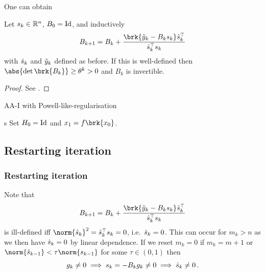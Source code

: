 \begin{frame}
	One can obtain
	\begin{lemma}
		Let $s_k\in\mathbb{R}^n$, $B_0=\operatorname{Id}$, and inductively
		\begin{align*}
			B_{k+1} = B_k+\frac{\brk{\tiy_k-B_ks_k}\hs_k^\top}{\hs_k^\top s_k}
		\end{align*}
		with $\hat{s}_k$ and $\tilde{y}_k$ defined as before. If this is well-defined then $\abs{\det\brk{B_k}}\geq \theta^k>0$ and $B_k$ is invertible.
	\end{lemma}
	\begin{proof}
		See \cite[Lemma 2]{ZhaAA}.
	\end{proof}
\end{frame}

\begin{frame}
	\begin{algorithm}[H]
	\caption{AA-I with Powell-like-regularisation}
	\color{gray}
s	
	\BlankLine
	Set $H_0=\operatorname{Id}$ and $x_1=f\brk{x_0}$.
	
	\end{algorithm}
\end{frame}

\subsection{Restarting iteration}
\begin{frame}
	\frametitle{Restarting iteration}
	Note that
	\begin{align*}
		B_{k+1} = B_k+\frac{\brk{\tiy_k-B_ks_k}\hs_k^\top}{\hs_k^\top s_k}
	\end{align*}
	is ill-defined iff $\norm{\hs_k}^2=\hs_k^\top s_k=0$, i.e.\ $\hat{s}_k=0$. This can occur for $m_k>n$ as we then have $\hat{s}_k=0$ by linear dependence.
	If we reset $m_k=0$ if $m_k=m+1$ or $\norm{\hs_{k-1}}<\tau\norm{s_{k-1}}$ for some $\tau\in(0,1)$
	then 
	$$g_k\neq 0 \implies s_k=-B_kg_k\neq 0\implies \hat{s}_k\neq 0\,.$$
\end{frame}

